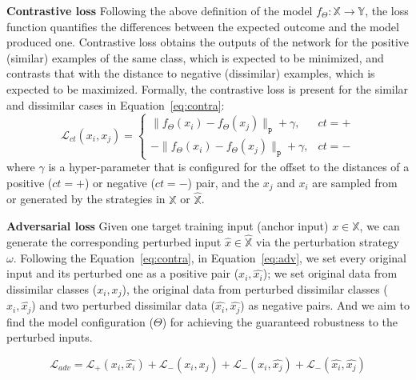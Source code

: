 \textbf{Contrastive loss} Following the above definition of the model $f_{\Theta}: \mathbb{X} \rightarrow \mathbb{Y}$, the loss function quantifies the differences between the expected outcome and the model produced one. Contrastive loss obtains the outputs of the network for the positive (similar) examples of the same class, which is expected to be minimized, and contrasts that with the distance to negative (dissimilar) examples, which is expected to be maximized. Formally, the contrastive loss is present for the similar and dissimilar cases in Equation~\eqref{eq:contra}:
\begin{equation}\label{eq:contra}
    \mathcal{L}_{ct}(x_i,x_j) = \left\{\begin{matrix}
                          \|f_{\Theta}(x_i)-f_{\Theta}(x_j)\|_{\mathtt{p}} + \gamma,    & ct=+ \\
                          - \|f_{\Theta}(x_i)-f_{\Theta}(x_j)\|_{\mathtt{p}} + \gamma,  & ct=-
    \end{matrix}\right.
\end{equation}
where $\gamma$ is a hyper-parameter that is configured for the offset to the distances of a positive ($ct=+$) or negative ($ct=-$) pair, and the $x_j$ and $x_i$ are sampled from or generated by the strategies in $\mathbb{X}$ or $\hat{\mathbb{X}}$. 

\textbf{Adversarial loss} Given one target training input (anchor input) $x\in\mathbb{X}$, we can generate the corresponding perturbed input $\hat{x} \in \hat{\mathbb{X}}$ via the perturbation strategy $\omega$. 
Following the Equation~\eqref{eq:contra}, in Equation~\eqref{eq:adv}, we set every original input and its perturbed one as a positive pair ($x_i,\hat{x_i}$); we set original data from dissimilar classes ($x_i,x_j$), the original data from perturbed dissimilar classes ($x_i,\hat{x_j}$) and two perturbed dissimilar data ($\hat{x_i},\hat{x_j}$) as negative pairs. And we aim to find the model configuration ($\Theta$) for achieving the guaranteed robustness to the perturbed inputs.

\begin{equation}\label{eq:adv}
    \mathcal{L}_{adv} = \mathcal{L}_{+}(x_i,\hat{x_i}) + \mathcal{L}_{-}(x_i,x_j) + \mathcal{L}_{-}(x_i,\hat{x_j})  + \mathcal{L}_{-}(\hat{x_i},\hat{x_j}) 
\end{equation}

